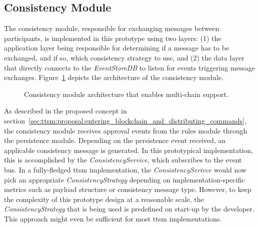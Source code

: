 \subsection{Consistency Module}
\label{sec:ttsm:prototype:consistency_module}
The consistency module, responsible for exchanging messages between participants, is implemented in this prototype using two layers: (1) the application layer being responsible for determining if a message has to be exchanged, and if so, which consistency strategy to use, and (2) the data layer that directly connects to the \textit{EventStoreDB} to listen for events triggering message exchanges. Figure~\ref{fig:ttsm:prototype:consistency_module_class_diagram} depicts the architecture of the consistency module.

\begin{figure}[h]
    \caption{Consistency module architecture that enables multi-chain support.}
    \label{fig:ttsm:prototype:consistency_module_class_diagram}
\end{figure}

As described in the proposed concept in section~\ref{sec:ttsm:proposal:entering_blockchain_and_distributing_commands}, the consistency module receives approval events from the rules module through the persistence module. Depending on the persistence event received, an applicable consistency message is generated. In this prototypical implementation, this is accomplished by the \textit{ConsistencyService}, which subscribes to the event bus. In a fully-fledged \gls{ttsm} implementation, the \textit{ConsistencySerivce} would now pick an appropriate \textit{ConsistencyStrategy} depending on implementation-specific metrics such as payload structure or consistency message type. However, to keep the complexity of this prototype design at a reasonable scale, the \textit{ConsistencyStrategy} that is being used is predefined on start-up by the developer. This approach might even be sufficient for most \gls{ttsm} implementations.

